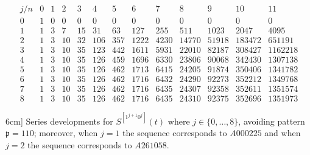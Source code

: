 

\begin{table}
\begin{equation*}
    \begin{array}{c|cccccccccccc}
        j/n & 0 & 1 & 2 & 3 & 4 & 5 & 6 & 7 & 8 & 9 & 10 & 11\\\hline0 & 1 & 0 & 0 & 0 & 0 & 0 & 0 & 0 & 0 & 0 & 0 & 0\\1 & 1 & 3 & 7 & 15 & 31 & 63 & 127 & 255 & 511 & 1023 & 2047 & 4095\\2 & 1 & 3 & 10 & 32 & 106 & 357 & 1222 & 4230 & 14770 & 51918 & 183472 & 651191\\3 & 1 & 3 & 10 & 35 & 123 & 442 & 1611 & 5931 & 22010 & 82187 & 308427 & 1162218\\4 & 1 & 3 & 10 & 35 & 126 & 459 & 1696 & 6330 & 23806 & 90068 & 342430 & 1307138\\5 & 1 & 3 & 10 & 35 & 126 & 462 & 1713 & 6415 & 24205 & 91874 & 350406 & 1341782\\6 & 1 & 3 & 10 & 35 & 126 & 462 & 1716 & 6432 & 24290 & 92273 & 352212 & 1349768\\7 & 1 & 3 & 10 & 35 & 126 & 462 & 1716 & 6435 & 24307 & 92358 & 352611 & 1351574\\8 & 1 & 3 & 10 & 35 & 126 & 462 & 1716 & 6435 & 24310 & 92375 & 352696 & 1351973
    \end{array}
\end{equation*}
\caption[Series developments for $S^{[1^{j+1}0^j]}(t)$ where $j\in \lbrace 0,\ldots,8 \rbrace$.]
        [6cm]{
    Series developments for $S^{[1^{j+1}0^j]}(t)$ where $j\in \lbrace
    0,\ldots,8 \rbrace$, avoiding
    pattern $\mathfrak{p}=110$; moreover,
    when $j=1$ the sequence corresponds to $A000225$ and
    when $j=2$ the sequence corresponds to $A261058$.
}
\label{tbl:S1_j1:0_j}
\end{table}

